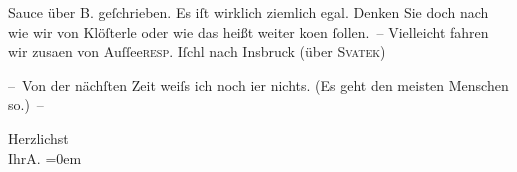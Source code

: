                Sauce über B. geſchrieben. Es iſt wirklich
               ziemlich egal. Denken Sie doch nach\strikeout{,} wie wir von Klöſterle oder wie das heißt weiter ko{\geminationm}en{ }ſollen. – Vielleicht fahren wir zusa{\geminationm}en von Auſſee\textsc{resp}. Iſchl nach Insbruck (über \textsc{Svatek})\pend
           
\pstart
           – Von der nächſten Zeit weiſs ich noch i{\geminationm}er nichts. (Es
               geht den meisten Menschen so.) –\pend
           
\pstart
           Herzlichst{\\[\baselineskip]}Ihr\spacefill\mbox{A.}\pend
           \leftskip=0em{}\endnumbering{}  \newcommand{\dateiname}{L01055}\newcommand{\titel}{Arthur Schnitzler an Richard Beer-Hofmann, 15. 7. 1900}\newcommand{\editorInnen}{Martin Anton Müller und Gerd-Hermann Susen}
